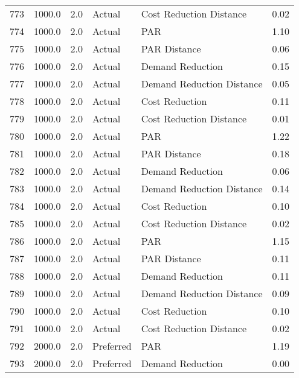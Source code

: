 \begin{longtable}{lrrllr}
773  &       1000.0 &     2.0 &         Actual &    Cost Reduction Distance &   0.02 \\
774  &       1000.0 &     2.0 &         Actual &                        PAR &   1.10 \\
775  &       1000.0 &     2.0 &         Actual &               PAR Distance &   0.06 \\
776  &       1000.0 &     2.0 &         Actual &           Demand Reduction &   0.15 \\
777  &       1000.0 &     2.0 &         Actual &  Demand Reduction Distance &   0.05 \\
778  &       1000.0 &     2.0 &         Actual &             Cost Reduction &   0.11 \\
779  &       1000.0 &     2.0 &         Actual &    Cost Reduction Distance &   0.01 \\
780  &       1000.0 &     2.0 &         Actual &                        PAR &   1.22 \\
781  &       1000.0 &     2.0 &         Actual &               PAR Distance &   0.18 \\
782  &       1000.0 &     2.0 &         Actual &           Demand Reduction &   0.06 \\
783  &       1000.0 &     2.0 &         Actual &  Demand Reduction Distance &   0.14 \\
784  &       1000.0 &     2.0 &         Actual &             Cost Reduction &   0.10 \\
785  &       1000.0 &     2.0 &         Actual &    Cost Reduction Distance &   0.02 \\
786  &       1000.0 &     2.0 &         Actual &                        PAR &   1.15 \\
787  &       1000.0 &     2.0 &         Actual &               PAR Distance &   0.11 \\
788  &       1000.0 &     2.0 &         Actual &           Demand Reduction &   0.11 \\
789  &       1000.0 &     2.0 &         Actual &  Demand Reduction Distance &   0.09 \\
790  &       1000.0 &     2.0 &         Actual &             Cost Reduction &   0.10 \\
791  &       1000.0 &     2.0 &         Actual &    Cost Reduction Distance &   0.02 \\
792  &       2000.0 &     2.0 &      Preferred &                        PAR &   1.19 \\
793  &       2000.0 &     2.0 &      Preferred &           Demand Reduction &   0.00 \\

\end{longtable}
